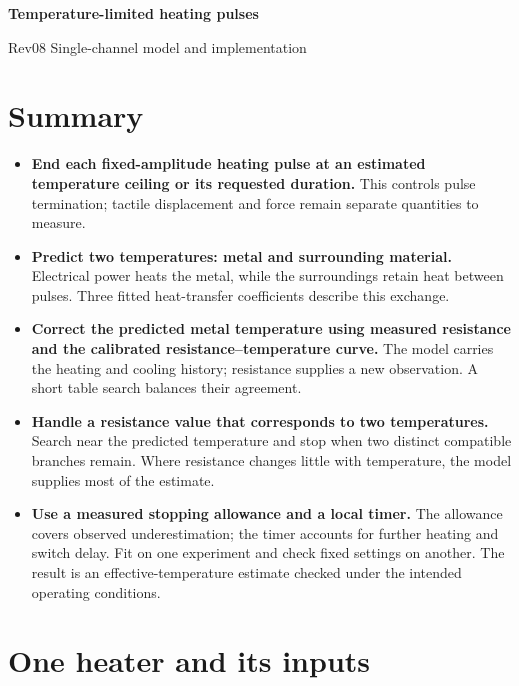 \documentclass[11pt,letterpaper]{article}
\begin{document}
\begin{center}
{\LARGE\bfseries Temperature-limited heating pulses\par}
\vspace{0.45em}
{\small Rev08 \textperiodcentered{} Single-channel model and implementation\par}
\end{center}
\vspace{0.25em}


\section*{Summary}

\begin{itemize}
\item \textbf{End each fixed-amplitude heating pulse at an estimated temperature ceiling or its requested duration.} This controls pulse termination; tactile displacement and force remain separate quantities to measure.
\item \textbf{Predict two temperatures: metal and surrounding material.} Electrical power heats the metal, while the surroundings retain heat between pulses. Three fitted heat-transfer coefficients describe this exchange.
\item \textbf{Correct the predicted metal temperature using measured resistance and the calibrated resistance--temperature curve.} The model carries the heating and cooling history; resistance supplies a new observation. A short table search balances their agreement.
\item \textbf{Handle a resistance value that corresponds to two temperatures.} Search near the predicted temperature and stop when two distinct compatible branches remain. Where resistance changes little with temperature, the model supplies most of the estimate.
\item \textbf{Use a measured stopping allowance and a local timer.} The allowance covers observed underestimation; the timer accounts for further heating and switch delay. Fit on one experiment and check fixed settings on another. The result is an effective-temperature estimate checked under the intended operating conditions.
\end{itemize}

\section{One heater and its inputs}
\end{document}
